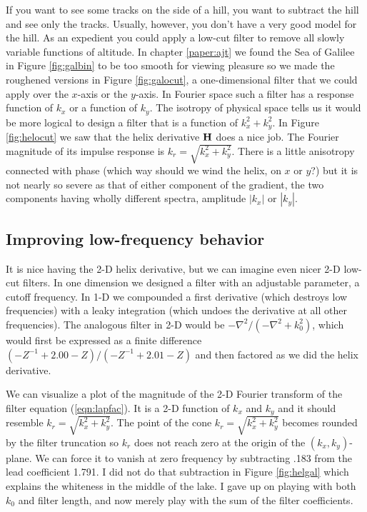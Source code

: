 \par
If you want to see some tracks on the side of a hill,
you want to subtract the hill and see only the tracks.
Usually, however, you don't have a very good model for the hill.
As an 
expedient you could apply a low-cut filter to remove all
slowly variable functions of altitude.
In chapter \ref{paper:ajt} we found the Sea of Galilee
in Figure \ref{fig:galbin} to be too smooth for viewing pleasure
so we made the roughened versions
in Figure \ref{fig:galocut},
a one-dimensional filter that we could apply
over the $x$-axis or the $y$-axis.
In Fourier space such a filter has a response function of $k_x$
or a function of $k_y$.
The isotropy of physical space tells us
it would be more logical to design a filter that
is a function of
$k_x^2+k_y^2$.
In Figure \ref{fig:helocut} we saw that the helix derivative
$\bold H$
does a nice job.
The Fourier magnitude of its impulse response is $k_r=\sqrt{k_x^2+k_y^2}$.
There is a little anisotropy connected with phase (which way should
we wind the helix, on $x$ or $y$?) but it is
not nearly so severe as that of either component of the gradient,
the two components having wholly different spectra,
amplitude $|k_x|$ or $|k_y|$.

\subsection{Improving low-frequency behavior}
\par
It is nice having the 2-D helix derivative,
but we can imagine even nicer 2-D low-cut filters.
In one dimension we designed a filter with an adjustable parameter,
a cutoff frequency.
In 1-D we compounded
a first derivative (which destroys low frequencies)
with a leaky integration (which undoes the derivative at all other frequencies).
The analogous filter in 2-D would be
$-\nabla^2 /(-\nabla^2 + k_0^2)$,
which would first be expressed as a finite difference
$ (-Z^{-1} + 2.00 - Z) / (-Z^{-1} + 2.01 - Z)$
and then factored as we did the helix derivative.
\par
We can visualize a plot of the magnitude of the 2-D
Fourier transform of the filter equation (\ref{eqn:lapfac}).
It is a 2-D function of $k_x$ and $k_y$ and it should
resemble $k_r=\sqrt{k_x^2+k_y^2}$.
The point of the cone $k_r=\sqrt{k_x^2+k_y^2}$ becomes
rounded by the filter truncation so
$k_r$ does not reach zero at the origin of the $(k_x,k_y)$-plane.
We can force it to vanish at zero frequency
by subtracting .183 from the lead coefficient 1.791.
I did not do that subtraction in Figure
\ref{fig:helgal}
which explains the whiteness in the middle of the lake.
I gave up on playing with both $k_0$ and filter length,
and now merely play with the sum of the filter coefficients.
